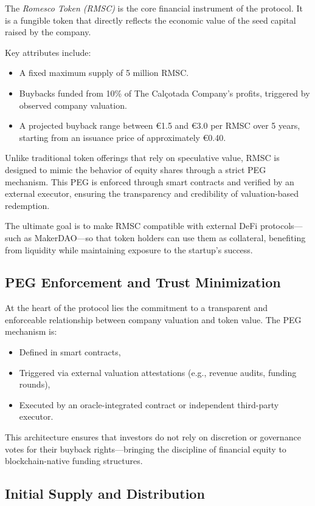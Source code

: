 \documentclass[conference]{IEEEtran}
\begin{document}
The \textit{Romesco Token (RMSC)} is the core financial instrument of the protocol. It is a fungible token that directly reflects the economic value of the seed capital raised by the company.

Key attributes include:
\begin{itemize}
    \item A fixed maximum supply of 5 million RMSC.
    \item Buybacks funded from 10\% of The Calçotada Company’s profits, triggered by observed company valuation.
    \item A projected buyback range between €1.5 and €3.0 per RMSC over 5 years, starting from an issuance price of approximately €0.40.
\end{itemize}

Unlike traditional token offerings that rely on speculative value, RMSC is designed to mimic the behavior of equity shares through a strict PEG mechanism. This PEG is enforced through smart contracts and verified by an external executor, ensuring the transparency and credibility of valuation-based redemption.

The ultimate goal is to make RMSC compatible with external DeFi protocols—such as MakerDAO—so that token holders can use them as collateral, benefiting from liquidity while maintaining exposure to the startup's success.

\subsection{PEG Enforcement and Trust Minimization}

At the heart of the protocol lies the commitment to a transparent and enforceable relationship between company valuation and token value. The PEG mechanism is:
\begin{itemize}
    \item Defined in smart contracts,
    \item Triggered via external valuation attestations (e.g., revenue audits, funding rounds),
    \item Executed by an oracle-integrated contract or independent third-party executor.
\end{itemize}

This architecture ensures that investors do not rely on discretion or governance votes for their buyback rights—bringing the discipline of financial equity to blockchain-native funding structures.

\subsection{Initial Supply and Distribution}
\end{document}
